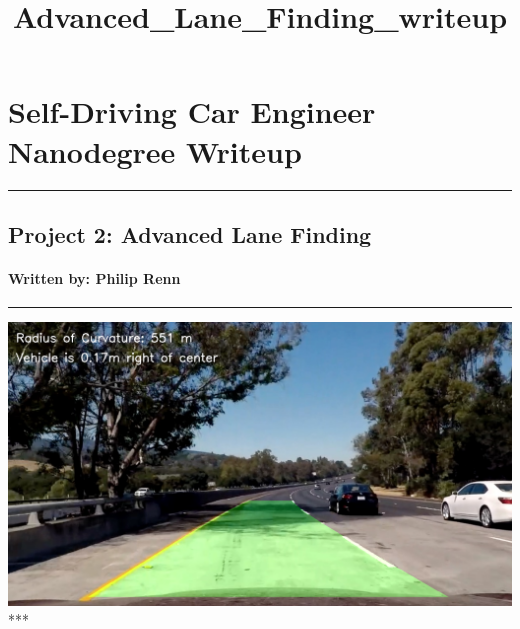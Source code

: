 \documentclass[11pt]{article}
\title{Advanced\_Lane\_Finding\_writeup}
\makeatletter
\def\maxwidth{\ifdim\Gin@nat@width>\linewidth\linewidth
    \else\Gin@nat@width\fi}
\let\Oldincludegraphics\includegraphics
\renewcommand{\includegraphics}[1]{\Oldincludegraphics[width=.8\maxwidth]{#1}}
\makeatother
\begin{document}
    
    
    \maketitle
    
    

    
    \hypertarget{self-driving-car-engineer-nanodegree-writeup}{%
\section{Self-Driving Car Engineer Nanodegree
Writeup}\label{self-driving-car-engineer-nanodegree-writeup}}

\begin{center}\rule{0.5\linewidth}{\linethickness}\end{center}

\hypertarget{project-2-advanced-lane-finding}{%
\subsection{\texorpdfstring{Project 2: \textbf{Advanced Lane
Finding}}{Project 2: Advanced Lane Finding}}\label{project-2-advanced-lane-finding}}

\hypertarget{written-by-philip-renn}{%
\paragraph{\texorpdfstring{\textbf{Written by: Philip
Renn}}{Written by: Philip Renn}}\label{written-by-philip-renn}}

\begin{center}\rule{0.5\linewidth}{\linethickness}\end{center}

\includegraphics{./output_images/writeup_images/result.png} ***
\end{document}
